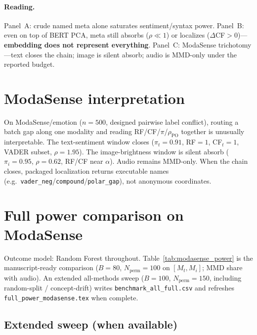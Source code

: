\documentclass[11pt]{article}
\begin{document}
\paragraph{Reading.}
Panel~A: crude named meta alone saturates sentiment/syntax power.
Panel~B: even on top of BERT PCA, meta still absorbs ($\rho{\ll}1$) or
localizes ($\Delta$CF${>}0$)---\textbf{embedding does not represent everything}.
Panel~C: ModaSense trichotomy---text closes the chain; image is silent
absorb; audio is MMD-only under the reported budget.

\section{ModaSense interpretation}
\label{sec:modasense}
On ModaSense/emotion ($n{=}500$, designed pairwise label conflict),
routing a batch gap along one modality and reading
RF/CF/$\pi$/$\rho_{\mathrm{PO}}$ together is unusually interpretable.
The text-sentiment window closes
($\pi_t{=}0.91$, RF${=}1$, CF$_t{=}1$, VADER subset, $\rho{=}1.95$).
The image-brightness window is silent absorb
($\pi_i{=}0.95$, $\rho{=}0.62$, RF/CF near $\alpha$).
Audio remains MMD-only.
When the chain closes, packaged localization returns executable names
(e.g.\ \texttt{vader\_neg}/\texttt{compound}/\texttt{polar\_gap}),
not anonymous coordinates.

\section{Full power comparison on ModaSense}
\label{sec:fullpower}
Outcome model: Random Forest throughout.
Table~\ref{tab:modasense_power} is the manuscript-ready comparison
($B{=}80$, $N_{\mathrm{perm}}{=}100$ on $[M_t,M_i]$; MMD share with audio).
An extended all-methods sweep ($B{=}100$, $N_{\mathrm{perm}}{=}150$,
including random-split / concept-drift) writes
\texttt{benchmark\_all\_full.csv} and refreshes
\texttt{full\_power\_modasense.tex} when complete.



\subsection*{Extended sweep (when available)}

\end{document}
